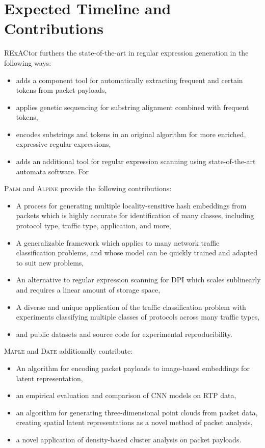\section{Expected Timeline and Contributions}

RExACtor furthers the state-of-the-art in regular expression generation in the following ways:

\begin{itemize}
\item adds a component tool for automatically extracting frequent and certain tokens from packet payloads,
\item applies genetic sequencing for substring alignment combined with frequent tokens,
\item encodes substrings and tokens in an original algorithm for more enriched, expressive regular expressions,
\item adds an additional tool for regular expression scanning using state-of-the-art automata software. For \end{itemize}

\textsc{Palm} and \textsc{Alpine} provide the following contributions:

\begin{itemize}
\item A process for generating multiple locality-sensitive hash embeddings from packets which is highly accurate for identification of many classes, including protocol type, traffic type, application, and more,
\item A generalizable framework which applies to many network traffic classification problems, and whose model can be quickly trained and adapted to suit new problems,
\item An alternative to regular expression scanning for DPI which scales sublinearly and requires a linear amount of storage space,
\item A diverse and unique application of the traffic classification problem with experiments classifying multiple classes of protocols across many traffic types,
\item and public datasets and source code for experimental reproducibility.
\end{itemize}

\textsc{Maple} and \textsc{Date} additionally contribute:

\begin{itemize}
\item An algorithm for encoding packet payloads to image-based embeddings for latent representation,
\item an empirical evaluation and comparison of CNN models on RTP data,
\item an algorithm for generating three-dimensional point clouds from packet data, creating spatial latent representations as a novel method of packet analysis,
\item a novel application of density-based cluster analysis on packet payloads.
\end{itemize}
